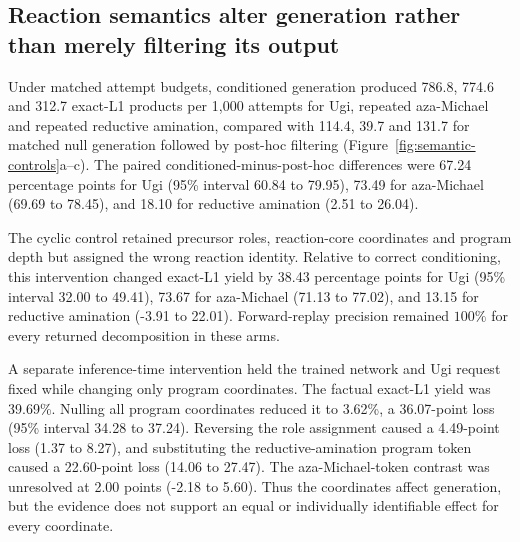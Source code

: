 \documentclass{article}
\newcommand{\ForgeCyclicBLCIHighPP}{77.02}
\newcommand{\ForgeCyclicBLCILowPP}{71.13}
\newcommand{\ForgeCyclicBLDifferencePP}{73.67}
\newcommand{\ForgeCyclicLXCIHighPP}{22.01}
\newcommand{\ForgeCyclicLXCILowPP}{-3.91}
\newcommand{\ForgeCyclicLXDifferencePP}{13.15}
\newcommand{\ForgeCyclicUgiCIHighPP}{49.41}
\newcommand{\ForgeCyclicUgiCILowPP}{32.00}
\newcommand{\ForgeCyclicUgiDifferencePP}{38.43}
\newcommand{\ForgeNullBLCIHighPP}{78.45}
\newcommand{\ForgeNullBLCILowPP}{69.69}
\newcommand{\ForgeNullBLDifferencePP}{73.49}
\newcommand{\ForgeNullLXCIHighPP}{26.04}
\newcommand{\ForgeNullLXCILowPP}{2.51}
\newcommand{\ForgeNullLXDifferencePP}{18.10}
\newcommand{\ForgeNullUgiCIHighPP}{79.95}
\newcommand{\ForgeNullUgiCILowPP}{60.84}
\newcommand{\ForgeNullUgiDifferencePP}{67.24}
\newcommand{\ForgeSemanticBLTokenCIHighPP}{5.60}
\newcommand{\ForgeSemanticBLTokenCILowPP}{-2.18}
\newcommand{\ForgeSemanticBLTokenDifferencePP}{2.00}
\newcommand{\ForgeSemanticFactualPercent}{39.69}
\newcommand{\ForgeSemanticLXTokenCIHighPP}{27.47}
\newcommand{\ForgeSemanticLXTokenCILowPP}{14.06}
\newcommand{\ForgeSemanticLXTokenDifferencePP}{22.60}
\newcommand{\ForgeSemanticNullCoordinatesCIHighPP}{37.24}
\newcommand{\ForgeSemanticNullCoordinatesCILowPP}{34.28}
\newcommand{\ForgeSemanticNullCoordinatesDifferencePP}{36.07}
\newcommand{\ForgeSemanticNullCoordinatesPercent}{3.62}
\newcommand{\ForgeSemanticReverseRoleCIHighPP}{8.27}
\newcommand{\ForgeSemanticReverseRoleCILowPP}{1.37}
\newcommand{\ForgeSemanticReverseRoleDifferencePP}{4.49}
\begin{document}
\subsection{Reaction semantics alter generation rather than merely filtering its output}
\label{app:semantic-intervention}

Under matched attempt budgets, conditioned generation produced
786.8, 774.6 and 312.7 exact-L1 products per 1,000 attempts for Ugi, repeated aza-Michael and
repeated reductive amination, compared with 114.4, 39.7 and 131.7 for matched null generation
followed by post-hoc filtering
(Figure~\ref{fig:semantic-controls}a--c).
The paired conditioned-minus-post-hoc differences were
\ForgeNullUgiDifferencePP{} percentage points for Ugi (95\% interval
\ForgeNullUgiCILowPP{} to \ForgeNullUgiCIHighPP), \ForgeNullBLDifferencePP{} for aza-Michael
(\ForgeNullBLCILowPP{} to \ForgeNullBLCIHighPP), and \ForgeNullLXDifferencePP{} for reductive
amination (\ForgeNullLXCILowPP{} to \ForgeNullLXCIHighPP).

The cyclic control retained precursor roles, reaction-core coordinates and program depth but assigned
the wrong reaction identity.
Relative to correct conditioning, this intervention changed exact-L1 yield by
\ForgeCyclicUgiDifferencePP{} percentage points for Ugi (95\% interval
\ForgeCyclicUgiCILowPP{} to \ForgeCyclicUgiCIHighPP), \ForgeCyclicBLDifferencePP{} for
aza-Michael (\ForgeCyclicBLCILowPP{} to \ForgeCyclicBLCIHighPP), and
\ForgeCyclicLXDifferencePP{} for reductive amination (\ForgeCyclicLXCILowPP{} to
\ForgeCyclicLXCIHighPP). Forward-replay precision remained $100\%$ for every returned
decomposition in these arms.

A separate inference-time intervention held the trained network and Ugi request fixed while changing
only program coordinates. The factual exact-L1 yield was \ForgeSemanticFactualPercent\%. Nulling all
program coordinates reduced it to \ForgeSemanticNullCoordinatesPercent\%, a
\ForgeSemanticNullCoordinatesDifferencePP-point loss (95\% interval
\ForgeSemanticNullCoordinatesCILowPP{} to \ForgeSemanticNullCoordinatesCIHighPP). Reversing the
role assignment caused a \ForgeSemanticReverseRoleDifferencePP-point loss
(\ForgeSemanticReverseRoleCILowPP{} to \ForgeSemanticReverseRoleCIHighPP), and substituting the
reductive-amination program token caused a \ForgeSemanticLXTokenDifferencePP-point loss
(\ForgeSemanticLXTokenCILowPP{} to \ForgeSemanticLXTokenCIHighPP). The aza-Michael-token contrast
was unresolved at \ForgeSemanticBLTokenDifferencePP{} points
(\ForgeSemanticBLTokenCILowPP{} to \ForgeSemanticBLTokenCIHighPP). Thus the coordinates affect
generation, but the evidence does not support an equal or individually identifiable effect for every
coordinate.
\end{document}
